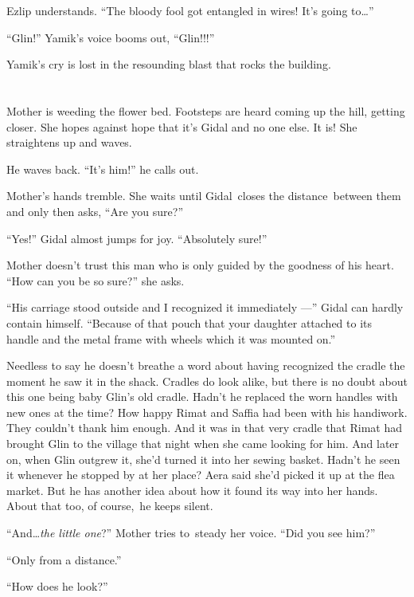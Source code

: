 \documentclass[twoside,11pt,openany]{book}
\begin{document}
Ezlip understands. ``The bloody fool got entangled in wires! It's going to{\ldots}''

``Glin!'' Yamik's voice booms{ }out,
``Glin!!!''

Yamik's cry is lost in the resounding blast that rocks the building.


\bigskip

\chapter{}

Mother is weeding the flower bed. Footsteps are heard coming up the hill, getting closer. She hopes against hope that
it's Gidal and{ }no one else. It is! She straightens up and waves.

He waves back. ``It's him!'' he calls out.

Mother's hands tremble. She waits until Gidal~closes the distance~between them and only then
asks,{ }``Are you sure?''

``Yes!'' Gidal almost jumps for joy. ``Absolutely sure!''

Mother doesn't trust this man who is only guided by the goodness of his heart. ``How can you be so sure?'' she asks.

``His carriage stood outside and I recognized it immediately ---'' Gidal can hardly contain
himself. ``Because of that pouch that your daughter attached to its handle and the metal frame with wheels
which it was mounted on.''

Needless to say he doesn't breathe a word about having recognized the cradle the moment he saw it in the shack. Cradles
do look alike, but there is no doubt about this one being baby Glin's old cradle. Hadn't he replaced the worn handles
with new ones at the time? How happy Rimat and Saffia had been with his handiwork. They couldn't thank him
enough{. }And it was in that very cradle that Rimat had
brought{ }Glin to the village that night when she came looking for him. And
later on, when Glin outgrew it, she'd turned it into her sewing basket. Hadn't he seen it whenever he stopped
by{ }at{ }her place? Aera said she'd picked it up at the flea market. But he has
another idea about how it found its way into her hands. About that too, of course,~he keeps silent.

``And{\ldots}\textit{the little one}?'' Mother tries to~steady her voice. ``Did
you see him?''

``Only from a distance.''

``How does he look?''
\end{document}
